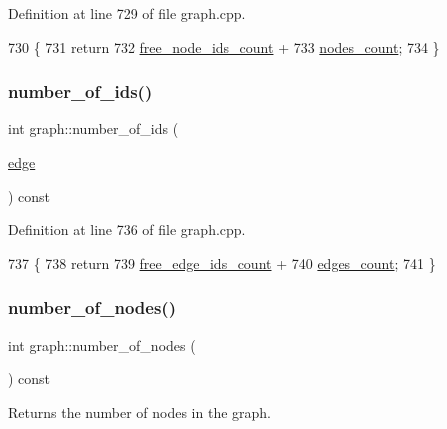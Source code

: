 Definition at line 729 of file graph.\+cpp.


\begin{DoxyCode}
730 \{
731     \textcolor{keywordflow}{return}
732     \mbox{\hyperlink{classgraph_a9480e2310fe64c3a8ad295bb3f119772}{free\_node\_ids\_count}} +
733     \mbox{\hyperlink{classgraph_a1f59223d0bcf647920963d7a661dd74a}{nodes\_count}};
734 \}
\end{DoxyCode}
\mbox{\label{classgraph_a8db97e43b31c95ac6b0bd1820aa5224b}} 
\subsubsection{\texorpdfstring{number\+\_\+of\+\_\+ids()}{number\_of\_ids()}\hspace{0.1cm}{\footnotesize\ttfamily [2/2]}}
{\footnotesize\ttfamily int graph\+::number\+\_\+of\+\_\+ids (\begin{DoxyParamCaption}\item[{\mbox{\hyperlink{classedge}{edge}}}]{ }\end{DoxyParamCaption}) const}



Definition at line 736 of file graph.\+cpp.


\begin{DoxyCode}
737 \{
738     \textcolor{keywordflow}{return}
739     \mbox{\hyperlink{classgraph_a336be547b5e0ca43b96cf00131e0e1da}{free\_edge\_ids\_count}} +
740     \mbox{\hyperlink{classgraph_af560ff4263ad165c166a46084e781b4a}{edges\_count}}; 
741 \}
\end{DoxyCode}
\mbox{\label{classgraph_a42c78e0a9f115655e3ff0efe35ebfc4e}} 
\subsubsection{\texorpdfstring{number\+\_\+of\+\_\+nodes()}{number\_of\_nodes()}}
{\footnotesize\ttfamily int graph\+::number\+\_\+of\+\_\+nodes (\begin{DoxyParamCaption}{ }\end{DoxyParamCaption}) const}

Returns the number of nodes in the graph.

